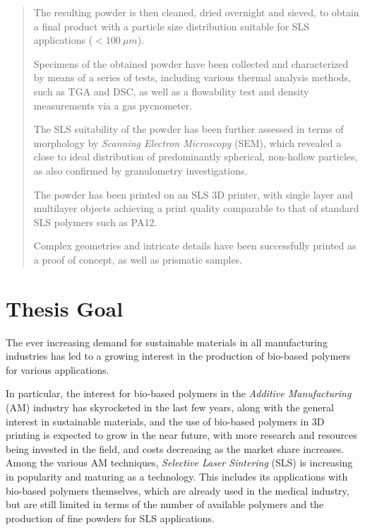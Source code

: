 \documentclass{article}
\begin{document}
\begin{abstract}
        The resulting powder is then cleaned, dried overnight and sieved, to obtain a final product with a particle size distribution suitable for SLS applications ($ < 100 \ \mu m $).


        Specimens of the obtained powder have been collected and characterized by means of a series of tests, including various thermal analysis methods, such as TGA and DSC, as well as a flowability test and density measurements via a gas pycnometer.

        The SLS suitability of the powder has been further assessed in terms of morphology by \textit{Scanning Electron Microscopy} (SEM), which revealed a close to ideal distribution of predominantly spherical, non-hollow particles, 
        as also confirmed by granulometry investigations. 

        The powder has been printed on an SLS 3D printer, with single layer and multilayer objects achieving a print quality comparable to that of standard SLS polymers such as PA12.

        Complex geometries and intricate details have been successfully printed as a proof of concept, as well as prismatic samples. 
                     


    \end{abstract}
    \newpage
    \tableofcontents
    \newpage 
    \listoffigures
    \listoftables

    \newpage

    \section{Thesis Goal\label{Thesis_Goal}}

    The ever increasing demand for sustainable materials in all manufacturing industries has led to a growing interest in the 
    production of bio-based polymers for various applications. 

    In particular, the interest for bio-based polymers in the \textit{Additive Manufacturing} (AM) industry has skyrocketed in the last few years, 
    along with the general interest in sustainable materials, and the use of bio-based polymers in 3D printing is expected to grow in the near future, 
    with more research and resources being invested in the field, and costs decreasing as the market share increases. \\  

    Among the various AM techniques, \textit{Selective Laser Sintering} (SLS) is increasing in popularity and 
    maturing as a technology. This includes its applications with bio-based polymers themselves, which are already used in the medical industry, 
    but are still limited in terms of the number of available polymers and the production of fine powders for SLS applications. \\ 
\end{document}
